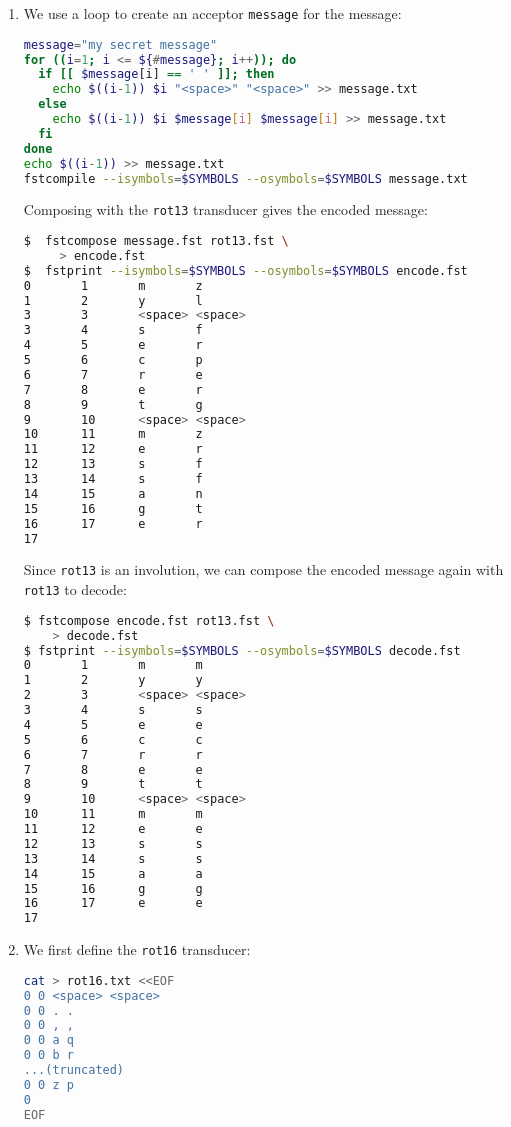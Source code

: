 \documentclass[a4paper,oneside,reqno]{amsart}
\begin{document}
\begin{enumerate}[label=\arabic*.]
\begin{enumerate}[label=(\alph*)]
      \item We use a loop to create an acceptor \texttt{message} for the message:
        \begin{lstlisting}[language=bash]
message="my secret message"
for ((i=1; i <= ${#message}; i++)); do
  if [[ $message[i] == ' ' ]]; then
    echo $((i-1)) $i "<space>" "<space>" >> message.txt
  else
    echo $((i-1)) $i $message[i] $message[i] >> message.txt
  fi
done
echo $((i-1)) >> message.txt
fstcompile --isymbols=$SYMBOLS --osymbols=$SYMBOLS message.txt
    \end{lstlisting}

    Composing with the \texttt{rot13} transducer gives the encoded message:
    \begin{lstlisting}[language=bash]
$  fstcompose message.fst rot13.fst \
     > encode.fst
$  fstprint --isymbols=$SYMBOLS --osymbols=$SYMBOLS encode.fst
0       1       m       z
1       2       y       l
3       3       <space> <space>
3       4       s       f
4       5       e       r
5       6       c       p
6       7       r       e
7       8       e       r
8       9       t       g
9       10      <space> <space>
10      11      m       z
11      12      e       r
12      13      s       f
13      14      s       f
14      15      a       n
15      16      g       t
16      17      e       r
17
    \end{lstlisting}

    Since \texttt{rot13} is an involution, we can compose the encoded
    message again with \texttt{rot13} to decode:
    \begin{lstlisting}[language=bash]
$ fstcompose encode.fst rot13.fst \
    > decode.fst
$ fstprint --isymbols=$SYMBOLS --osymbols=$SYMBOLS decode.fst
0       1       m       m
1       2       y       y
2       3       <space> <space>
3       4       s       s
4       5       e       e
5       6       c       c
6       7       r       r
7       8       e       e
8       9       t       t
9       10      <space> <space>
10      11      m       m
11      12      e       e
12      13      s       s
13      14      s       s
14      15      a       a
15      16      g       g
16      17      e       e
17
    \end{lstlisting}

  \item We first define the \texttt{rot16} transducer:
    \begin{lstlisting}[language=bash]
cat > rot16.txt <<EOF
0 0 <space> <space>
0 0 . .
0 0 , ,
0 0 a q
0 0 b r
...(truncated)
0 0 z p
0
EOF
    \end{lstlisting}


\end{enumerate}
\end{enumerate}
\end{document}
